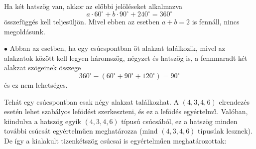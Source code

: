 \documentclass[a4paper,10pt]{article}
\begin{document}
Ha két hatszög van, akkor az előbbi jelöléseket alkalmazva
\[
    a\cdot 60^\circ + b\cdot 90^\circ + 240^\circ = 360^\circ
\]
összefüggés kell teljesüljön. Mivel ebben az esetben $a+b = 2$ is fennáll,
 nincs megoldásunk.

$\bullet$ Abban az esetben, ha egy csúcspontban öt alakzat
találkozik, mivel az alakzatok között kell legyen
háromszög, négyzet és hatszög is, a fennmaradt két
alakzat szögeinek összege $$360^\circ - (60^\circ + 90^\circ +
120^\circ) = 90^\circ$$ és ez nem lehetséges.

Tehát egy csúcspontban csak négy alakzat találkozhat. A $(4,3,4,6)$ elrendezés esetén lehet szabályos
lefödést szerkeszteni, és ez a lefödés egyértelmű.
Valóban, kiindulva a hatszög egyik $(4,3,4,6)$ típusú
csúcsából, ez a hatszög minden további csúcsát
egyértelműen meghatározza (mind $(4,3,4,6)$ típusúak
lesznek). De így a kialakult tizenkétszög csúcsai is
egyértelműen meghatározottak:
\end{document}

